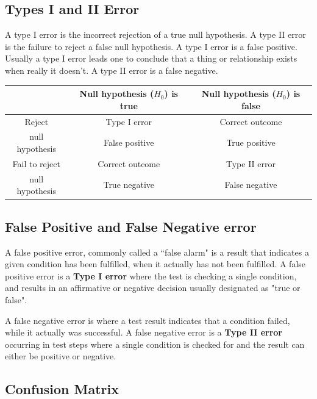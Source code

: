 \documentclass[12pt]{article} %
\begin{document}
\subsection{Types I and II Error}
A type I error is the incorrect rejection of a true null hypothesis.
A type II error is the failure to reject a false null hypothesis.
A type I error is a false positive. Usually a type I error leads one to conclude that a thing
or relationship exists when really it doesn't.
A type II error is a false negative.
\begin{tabular}{|c|c|c|}
  \hline

& Null hypothesis ($H_0$) is true	& Null hypothesis ($H_0$) is false\\ \hline
Reject  & Type I error          & Correct outcome \\
null hypothesis 			& False positive	& True positive\\ \hline
Fail to reject 	&Correct outcome&Type II error\\
null hypothesis & True negative	& False negative\\
  \hline
\end{tabular}
\subsection{False Positive and False Negative error}

A false positive error, commonly called a ``false alarm" is a result that indicates a
given condition has been fulfilled, when it actually has not been fulfilled.
A false positive error is a \textbf{Type I error} where the test is checking a single condition,
and results in an affirmative or negative decision usually designated as "true or false".

A false negative error is where a test result indicates that a condition failed, while it actually was successful.
A false negative error is a \textbf{Type II error} occurring in test steps where a single
condition is checked for and the result can either be positive or negative.


\subsection{Confusion Matrix}
\end{document}
